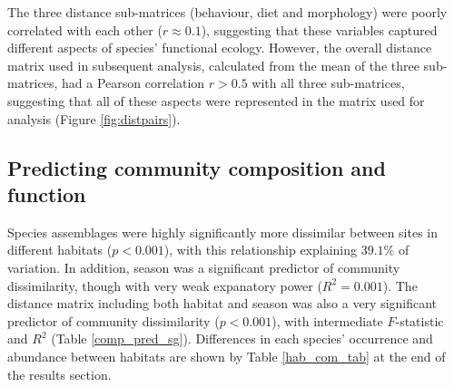 The three distance sub-matrices (behaviour, diet and morphology) were poorly correlated with each other ($r \approx 0.1$), suggesting that these variables captured different aspects of species' functional ecology. 
However, the overall distance matrix used in subsequent analysis, calculated from the mean of the three sub-matrices, had a Pearson correlation $r > 0.5$ with all three sub-matrices, suggesting that all of these aspects were represented in the matrix used for analysis (Figure \ref{fig:distpairs}).

\clearpage
\subsection{Predicting community composition and function}



Species assemblages were highly significantly more dissimilar between sites in different habitats ($p < 0.001$), with this relationship explaining $39.1$\% of variation. In addition, season was a significant predictor of community dissimilarity, though with very weak expanatory power ($R^2 = 0.001$). The distance matrix including both habitat and season was also a very significant predictor of community dissimilarity ($p < 0.001$), with intermediate $F$-statistic and $R^2$ (Table \ref{comp_pred_sg}). Differences in each species' occurrence and abundance between habitats are shown by Table \ref{hab_com_tab} at the end of the results section.


